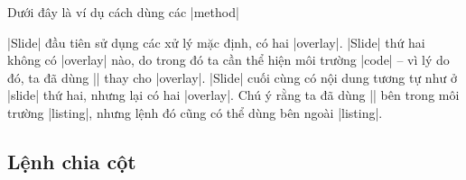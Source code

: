 Dưới đây là ví dụ cách dùng các |method|
|Slide| đầu tiên sử dụng các xử lý mặc định, có hai |overlay|.
|Slide| thứ hai không có |overlay| nào, do trong đó ta cần thể hiện
môi trường |code| -- vì lý do đó, ta đã dùng |\pause| thay cho |overlay|.
|Slide| cuối cùng có nội dung tương tự như ở |slide| thứ hai, nhưng
lại có hai |overlay|. Chú ý rằng ta đã dùng |\pause| bên trong môi trường
|listing|, nhưng lệnh đó cũng có thể dùng bên ngoài |listing|.


\subsection{\texorpdfstring{Lệnh}{Lenh}  \texorpdfstring{chia cột}{chia cot}}

